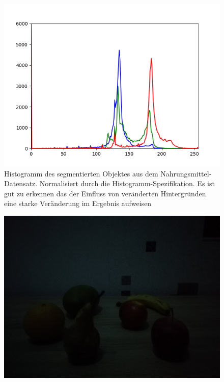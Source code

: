 \begin{appendices}
\begin{figure}[htb]
\begin{minipage}[c]{0.08\textwidth}
\end{minipage}
\hfill
\begin{minipage}[c]{0.3\textwidth}
\includegraphics[width=\textwidth]{Sources/Bild3_HS_histo.png}
\end{minipage}
\caption{Histogramm des segmentierten Objektes aus dem Nahrungsmittel-Datensatz. Normalisiert durch die Histogramm-Spezifikation. Es ist gut zu erkennen das der Einfluss von veränderten Hintergründen eine starke Veränderung im Ergebnis aufweisen}
\label{img:evalHS}
\end{figure}
\newpage
\begin{figure}[htbp]
\center
\begin{minipage}{0.49\textwidth}
\includegraphics[width=.8\textwidth]{Sources/Anhang/resize_0250.jpg}
\end{minipage}
\begin{minipage}{0.49\textwidth}

\end{minipage}
\end{figure}
\end{appendices}
